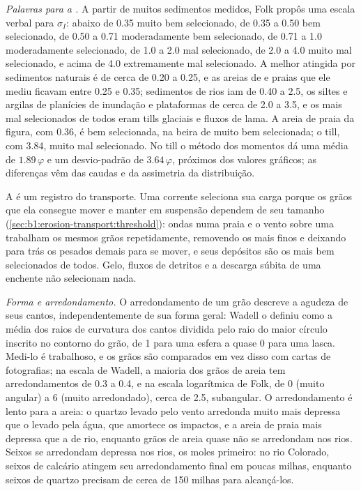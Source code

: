 \emph{Palavras para a .} A partir de muitos sedimentos medidos, Folk propôs uma escala verbal para $\sigma_I$: abaixo de \num{0.35} muito bem selecionado, de \num{0.35} a \num{0.50} bem selecionado, de \num{0.50} a \num{0.71} moderadamente bem selecionado, de \num{0.71} a \num{1.0} moderadamente selecionado, de \num{1.0} a \num{2.0} mal selecionado, de \num{2.0} a \num{4.0} muito mal selecionado, e acima de \num{4.0} extremamente mal selecionado. A melhor  atingida por sedimentos naturais é de cerca de \num{0.20} a \num{0.25}, e as areias de  e praias que ele mediu ficavam entre \num{0.25} e \num{0.35}; sedimentos de rios iam de \num{0.40} a \num{2.5}, os siltes e argilas de planícies de inundação e plataformas de cerca de \num{2.0} a \num{3.5}, e os mais mal selecionados de todos eram tills glaciais e fluxos de lama. A areia de praia da figura, com \num{0.36}, é bem selecionada, na beira de muito bem selecionada; o till, com \num{3.84}, muito mal selecionado. No till o método dos momentos dá uma média de $1.89\,\varphi$ e um desvio-padrão de $3.64\,\varphi$, próximos dos valores gráficos; as diferenças vêm das caudas e da assimetria da distribuição.

A  é um registro do transporte. Uma corrente seleciona sua carga porque os grãos que ela consegue mover e manter em suspensão dependem de seu tamanho (\cref{sec:b1:erosion-transport:threshold}): ondas numa praia e o vento sobre uma  trabalham os mesmos grãos repetidamente, removendo os mais finos e deixando para trás os pesados demais para se mover, e seus depósitos são os mais bem selecionados de todos. Gelo, fluxos de detritos e a descarga súbita de uma enchente não selecionam nada.

\emph{Forma e arredondamento.} O arredondamento de um grão descreve a agudeza de seus cantos, independentemente de sua forma geral: Wadell o definiu como a média dos raios de curvatura dos cantos dividida pelo raio do maior círculo inscrito no contorno do grão, de 1 para uma esfera a quase 0 para uma lasca. Medi-lo é trabalhoso, e os grãos são comparados em vez disso com cartas de fotografias; na escala de Wadell, a maioria dos grãos de areia tem arredondamentos de \num{0.3} a \num{0.4}, e na escala logarítmica de Folk, de 0 (muito angular) a 6 (muito arredondado), cerca de \num{2.5}, subangular. O arredondamento é lento para a areia: o quartzo levado pelo vento arredonda muito mais depressa que o levado pela água, que amortece os impactos, e a areia de praia mais depressa que a de rio, enquanto grãos de areia quase não se arredondam nos rios. Seixos se arredondam depressa nos rios, os moles primeiro: no rio Colorado, seixos de calcário atingem seu arredondamento final em poucas milhas, enquanto seixos de quartzo precisam de cerca de 150 milhas para alcançá-los.

